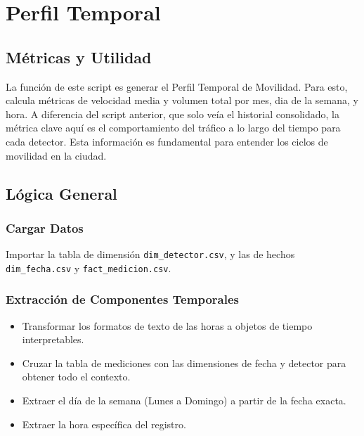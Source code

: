 \section{Perfil Temporal}

\subsection{Métricas y Utilidad}

La función de este script es generar el Perfil Temporal de Movilidad. 
Para esto, calcula métricas de velocidad media y volumen total por mes, dia de 
la semana, y hora. 
A diferencia del script anterior, que solo veía el historial consolidado, la 
métrica clave aquí es el comportamiento del tráfico a lo largo del tiempo 
para cada detector. 
Esta información es fundamental para entender los ciclos de movilidad en la 
ciudad. 

\subsection{Lógica General}

\subsubsection*{Cargar Datos}

Importar la tabla de dimensi\'on
\texttt{dim\_detector.csv}, y las de hechos 
\texttt{dim\_fecha.csv} y
\texttt{fact\_medicion.csv}.

\subsubsection*{Extracción de Componentes Temporales}
\begin{itemize}[noitemsep]
    \item Transformar los formatos de texto de las horas a objetos de tiempo 
        interpretables.
    \item Cruzar la tabla de mediciones con las dimensiones de fecha y 
        detector para obtener todo el contexto.
    \item Extraer el día de la semana (Lunes a Domingo) a partir de la fecha 
        exacta.
    \item Extraer la hora específica del registro.
\end{itemize}

